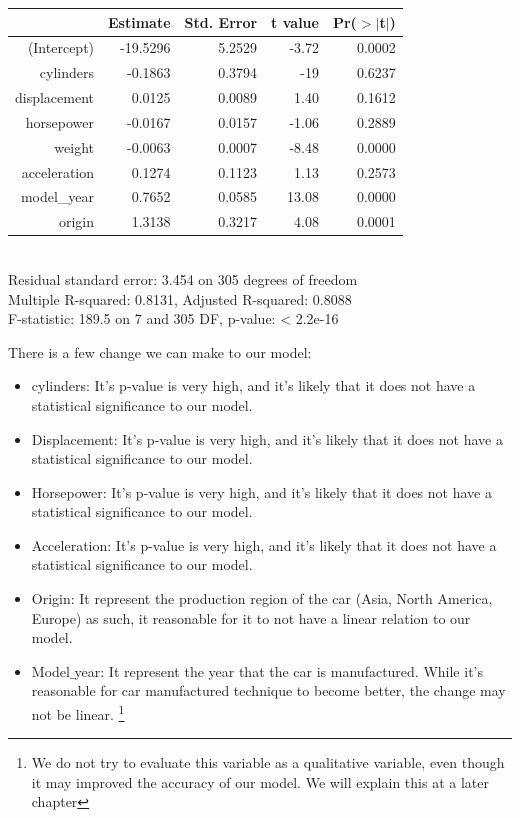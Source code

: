\begin{table}[H]
\centering
{}
\begin{tabular}{rrrrr}
  \hline
 & Estimate & Std. Error & t value & Pr($>$$|$t$|$) \\ 
  \hline
(Intercept) & -19.5296 & 5.2529 & -3.72 & 0.0002 \\ 
  cylinders & -0.1863 & 0.3794 & -19 & 0.6237 \\ 
  displacement & 0.0125 & 0.0089 & 1.40 & 0.1612 \\ 
  horsepower & -0.0167 & 0.0157 & -1.06 & 0.2889 \\ 
  weight & -0.0063 & 0.0007 & -8.48 & 0.0000 \\ 
  acceleration & 0.1274 & 0.1123 & 1.13 & 0.2573 \\ 
  model\_year & 0.7652 & 0.0585 & 13.08 & 0.0000 \\ 
  origin & 1.3138 & 0.3217 & 4.08 & 0.0001 \\ 
   \hline
\end{tabular}
\\[0.5cm]
Residual standard error: 3.454 on 305 degrees of freedom
\\
Multiple R-squared:  0.8131,	Adjusted R-squared:  0.8088
\\
F-statistic: 189.5 on 7 and 305 DF,  p-value: < 2.2e-16
\end{table}

There is a few change we can make to our model:

\begin{itemize}
    \item cylinders: It's p-value is very high, and it's likely that it does not have a statistical significance to our model.
    \item Displacement: It's p-value is very high, and it's likely that it does not have a statistical significance to our model.
    \item Horsepower: It's p-value is very high, and it's likely that it does not have a statistical significance to our model.
    \item Acceleration: It's p-value is very high, and it's likely that it does not have a statistical significance to our model.
    \item Origin: It represent the production region of the car (Asia, North America, Europe) as such, it reasonable for it to not have a linear relation to our model.
    \item Model$\_$year: It represent the year that the car is manufactured. While it's reasonable for car manufactured technique to become better, the change may not be linear. \footnote{We do not try to evaluate this variable as a qualitative variable, even though it may improved the accuracy of our model. We will explain this at a later chapter}
\end{itemize}

